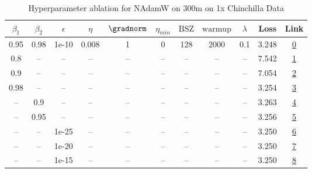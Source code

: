 \begin{table}[H]
\centering
\caption{Hyperparameter ablation for NAdamW on 300m on 1x Chinchilla Data}
\label{tab:ablation_nadamw_300m_on_1x_chinchilla_data}
\begin{tabular}{ccccccccccc}
\toprule
$\beta_1$ & $\beta_2$ & $\epsilon$ & $\eta$ & $\gradnorm$ & $\eta_{min}$ & $\mathrm{BSZ}$ & $\mathrm{warmup}$ & $\lambda$ & Loss & Link \\
\midrule
0.95 & 0.98 & 1e-10 & 0.008 & 1 & 0 & 128 & 2000 & 0.1 & 3.248 & \href{https://wandb.ai/stanford-mercury/optimizer-scaling/runs/sweep-300m-6B-nadamwf15cf6lr0.008-wd0.1-minlr0-warmup2000-b10.95-28ca3a}{0} \\
\midrule
0.8 & -- & -- & -- & -- & -- & -- & -- & -- & 7.542 & \href{https://wandb.ai/stanford-mercury/optimizer-scaling/runs/sweep-300m-6B-nadamw0ba9cdlr0.008-wd0.1-minlr0-warmup2000-b10.8--70e8b0}{1} \\
0.9 & -- & -- & -- & -- & -- & -- & -- & -- & 7.054 & \href{https://wandb.ai/stanford-mercury/optimizer-scaling/runs/sweep-300m-6B-nadamwacb766lr0.008-wd0.1-minlr0-warmup2000-b10.9--ff6a2e}{2} \\
0.98 & -- & -- & -- & -- & -- & -- & -- & -- & 3.254 & \href{https://wandb.ai/stanford-mercury/optimizer-scaling/runs/sweep-300m-6B-nadamwd6541dlr0.008-wd0.1-minlr0-warmup2000-b10.98-84afaa}{3} \\
-- & 0.9 & -- & -- & -- & -- & -- & -- & -- & 3.263 & \href{https://wandb.ai/stanford-mercury/optimizer-scaling/runs/sweep-300m-6B-nadamw6046ddlr0.008-wd0.1-minlr0-warmup2000-b10.95-127527}{4} \\
-- & 0.95 & -- & -- & -- & -- & -- & -- & -- & 3.256 & \href{https://wandb.ai/stanford-mercury/optimizer-scaling/runs/sweep-300m-6B-nadamwc2a8e4lr0.008-wd0.1-minlr0-warmup2000-b10.95-3a5d38}{5} \\
-- & -- & 1e-25 & -- & -- & -- & -- & -- & -- & 3.250 & \href{https://wandb.ai/stanford-mercury/optimizer-scaling/runs/sweep-300m-6B-nadamwb27e94lr0.008-wd0.1-minlr0-warmup2000-b10.95-4bf48d}{6} \\
-- & -- & 1e-20 & -- & -- & -- & -- & -- & -- & 3.250 & \href{https://wandb.ai/stanford-mercury/optimizer-scaling/runs/sweep-300m-6B-nadamw43c706lr0.008-wd0.1-minlr0-warmup2000-b10.95-bf751b}{7} \\
-- & -- & 1e-15 & -- & -- & -- & -- & -- & -- & 3.250 & \href{https://wandb.ai/stanford-mercury/optimizer-scaling/runs/sweep-300m-6B-nadamw770e16lr0.008-wd0.1-minlr0-warmup2000-b10.95-126b23}{8} \\

\end{tabular}
\end{table}
